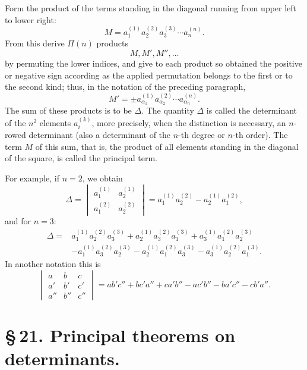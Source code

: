 \documentclass[11pt]{article}
\begin{document}
Form the product of the terms standing in the diagonal running from upper left to lower right:
\begin{equation}
 M=a_1^{(1)}a_2^{(2)}a_3^{(3)}\cdots a_n^{(n)}.
\tag{2}
\end{equation}
From this derive \(\Pi(n)\) products
\[
 M,M',M'',\ldots
\]
by permuting the lower indices, and give to each product so obtained the positive or negative sign according as the applied permutation belongs to the first or to the second kind; thus, in the notation of the preceding paragraph,
\begin{equation}
 M'=\pm a_{\alpha_1}^{(1)}a_{\alpha_2}^{(2)}\cdots a_{\alpha_n}^{(n)}.
\tag{3}
\end{equation}
The sum of these products is to be \(\Delta\). The quantity \(\Delta\) is called the determinant of the \(n^2\) elements \(a_i^{(k)}\), more precisely, when the distinction is necessary, an \(n\)-rowed determinant (also a determinant of the \(n\)-th degree or \(n\)-th order). The term \(M\) of this sum, that is, the product of all elements standing in the diagonal of the square, is called the principal term.

For example, if \(n=2\), we obtain
\begin{equation}
\Delta=
\begin{vmatrix}
a_1^{(1)}&a_2^{(1)}\\
a_1^{(2)}&a_2^{(2)}
\end{vmatrix}
= a_1^{(1)}a_2^{(2)}-a_2^{(1)}a_1^{(2)},
\tag{4}
\end{equation}
and for \(n=3\):
\begin{equation}
\begin{aligned}
\Delta={}&a_1^{(1)}a_2^{(2)}a_3^{(3)}
+a_2^{(1)}a_3^{(2)}a_1^{(3)}
+a_3^{(1)}a_1^{(2)}a_2^{(3)}\\
&-a_1^{(1)}a_3^{(2)}a_2^{(3)}
-a_2^{(1)}a_1^{(2)}a_3^{(3)}
-a_3^{(1)}a_2^{(2)}a_1^{(3)}.
\end{aligned}
\tag{5}
\end{equation}
In another notation this is
\begin{equation}
\begin{vmatrix}
a&b&c\\
a'&b'&c'\\
a''&b''&c''
\end{vmatrix}
=ab'c''+bc'a''+ca'b''-ac'b''-ba'c''-cb'a''.
\tag{6}
\end{equation}

\section*{\S\,21. Principal theorems on determinants.}
\end{document}
